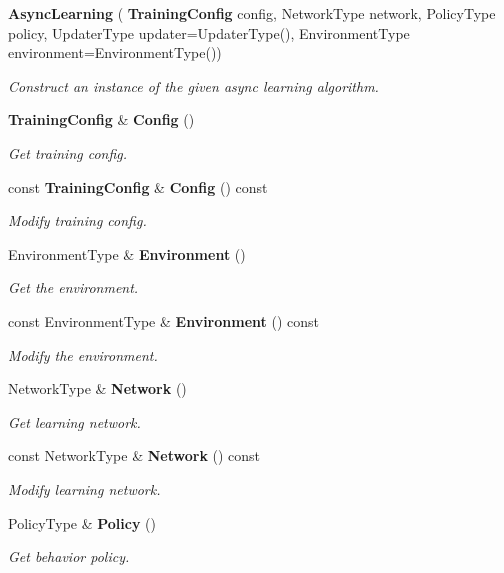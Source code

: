 \begin{DoxyCompactItemize}
\item 
\textbf{ Async\+Learning} (\textbf{ Training\+Config} config, Network\+Type network, Policy\+Type policy, Updater\+Type updater=Updater\+Type(), Environment\+Type environment=Environment\+Type())
\begin{DoxyCompactList}\small\item\em Construct an instance of the given async learning algorithm. \end{DoxyCompactList}\item 
\textbf{ Training\+Config} \& \textbf{ Config} ()
\begin{DoxyCompactList}\small\item\em Get training config. \end{DoxyCompactList}\item 
const \textbf{ Training\+Config} \& \textbf{ Config} () const
\begin{DoxyCompactList}\small\item\em Modify training config. \end{DoxyCompactList}\item 
Environment\+Type \& \textbf{ Environment} ()
\begin{DoxyCompactList}\small\item\em Get the environment. \end{DoxyCompactList}\item 
const Environment\+Type \& \textbf{ Environment} () const
\begin{DoxyCompactList}\small\item\em Modify the environment. \end{DoxyCompactList}\item 
Network\+Type \& \textbf{ Network} ()
\begin{DoxyCompactList}\small\item\em Get learning network. \end{DoxyCompactList}\item 
const Network\+Type \& \textbf{ Network} () const
\begin{DoxyCompactList}\small\item\em Modify learning network. \end{DoxyCompactList}\item 
Policy\+Type \& \textbf{ Policy} ()
\begin{DoxyCompactList}\small\item\em Get behavior policy. \end{DoxyCompactList}\item 

\end{DoxyCompactItemize}

